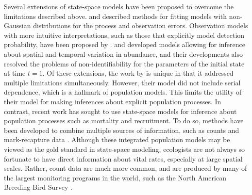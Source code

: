 \documentclass[12pt]{article}
\begin{document}
Several extensions of state-space models have been proposed to
overcome the limitations described
above. \citet{devalpine_hastings:2002} and \citet{kery_etal:2009}
described methods for fitting models with non-Gaussian distributions
for the process and observation errors. Observation models with more
intuitive interpretations, such as those that explicitly model
detection probability, have been proposed by
\citet{kery_etal:2009}. \citet{lele_etal:1998} and
\citet{kery_etal:2009} developed models allowing for inference about
spatial and temporal variation in abundance, and their developments
also resolved the problems of non-identifiability for the parameters
of the initial state at time $t=1$. Of these extensions, the work by
\citet{kery_etal:2009} is unique in that it addressed multiple limitations
simultaneously. However, their model did not include serial
dependence, which is a hallmark of population models. This limits the
utility of their model for making inferences about explicit population
processes. In contrast, recent work has sought to use state-space
models for inference about population processes such as mortality and
recruitment. To do so, methods have been developed to combine multiple
sources of information, such as counts and mark-recapture data
\citep{besbeas_etal:2002, buckland_etal:2004,
  schaub_etal:2007}. Although these integrated
population models may be viewed as the gold standard in state-space
modeling, ecologists are not always so fortunate to have direct
information about vital rates, especially at large spatial scales.
Rather, count data are much more common, and
are produced by many of the largest monitoring programs in the world,
such as the North American Breeding Bird Survey
\citep[BBS;][]{robbins_etal:1986}.
\end{document}
